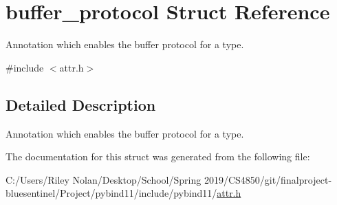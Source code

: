 \hypertarget{structbuffer__protocol}{}\section{buffer\+\_\+protocol Struct Reference}
\label{structbuffer__protocol}


Annotation which enables the buffer protocol for a type.  




{\ttfamily \#include $<$attr.\+h$>$}



\subsection{Detailed Description}
Annotation which enables the buffer protocol for a type. 

The documentation for this struct was generated from the following file\+:\begin{DoxyCompactItemize}
\item 
C\+:/\+Users/\+Riley Nolan/\+Desktop/\+School/\+Spring 2019/\+C\+S4850/git/finalproject-\/bluesentinel/\+Project/pybind11/include/pybind11/\mbox{\hyperlink{attr_8h}{attr.\+h}}\end{DoxyCompactItemize}
